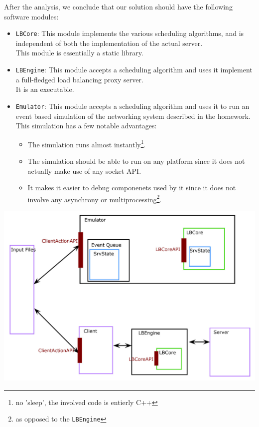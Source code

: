 \documentclass{article}
\begin{document}
After the analysis, we conclude that our solution should have the following software modules:
\begin{itemize}
    \item \texttt{LBCore}: This module implements the various scheduling algorithms,
    and is independent of both the implementation of the actual server.\\
    This module is essentially a static library.
    \item \texttt{LBEngine}: This module accepts a scheduling algorithm and uses it implement a full-fledged
    load balancing proxy server.\\
    It is an executable.
    \item \texttt{Emulator}: This module accepts a scheduling algorithm and uses it to run an event based simulation
    of the networking system described in the homework. This simulation has a few notable advantages:
    \begin{itemize}
        \item The simulation runs almost instantly\footnote{no 'sleep', the involved code is entierly C++}.
        \item The simulation should be able to run on any platform since it does not actually make use of any socket API.
        \item It makes it easier to debug componenets used by it since it does not involve any asynchrony or multiprocessing\footnote{as opposed to the \texttt{LBEngine}}.
    \end{itemize}
\end{itemize}
\begin{center}
    \includegraphics[width=1.2\textwidth]{design_graph.png}
\end{center}
\end{document}
